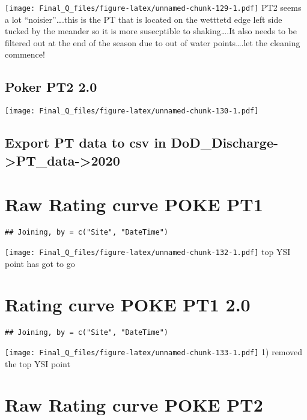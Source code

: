 \documentclass[
]{article}
\begin{document}
\texttt{[image: Final\_Q\_files/figure-latex/unnamed-chunk-129-1.pdf]} PT2
seems a lot ``noisier''\ldots.this is the PT that is located on the
wetttetd edge left side tucked by the meander so it is more susecptible
to shaking\ldots.It also needs to be filtered out at the end of the
season due to out of water points\ldots.let the cleaning commence!

\hypertarget{poker-pt2-2.0}{%
\subsection{Poker PT2 2.0}\label{poker-pt2-2.0}}

\texttt{[image: Final\_Q\_files/figure-latex/unnamed-chunk-130-1.pdf]}

\hypertarget{export-pt-data-to-csv-in-dod_discharge-pt_data-2020-2}{%
\subsection{Export PT data to csv in
DoD\_Discharge-\textgreater PT\_data-\textgreater2020}\label{export-pt-data-to-csv-in-dod_discharge-pt_data-2020-2}}

\hypertarget{raw-rating-curve-poke-pt1}{%
\section{Raw Rating curve POKE PT1}\label{raw-rating-curve-poke-pt1}}

\begin{verbatim}
## Joining, by = c("Site", "DateTime")
\end{verbatim}

\texttt{[image: Final\_Q\_files/figure-latex/unnamed-chunk-132-1.pdf]} top
YSI point has got to go

\hypertarget{rating-curve-poke-pt1-2.0}{%
\section{Rating curve POKE PT1 2.0}\label{rating-curve-poke-pt1-2.0}}

\begin{verbatim}
## Joining, by = c("Site", "DateTime")
\end{verbatim}

\texttt{[image: Final\_Q\_files/figure-latex/unnamed-chunk-133-1.pdf]} 1)
removed the top YSI point

\hypertarget{raw-rating-curve-poke-pt2}{%
\section{Raw Rating curve POKE PT2}\label{raw-rating-curve-poke-pt2}}
\end{document}
